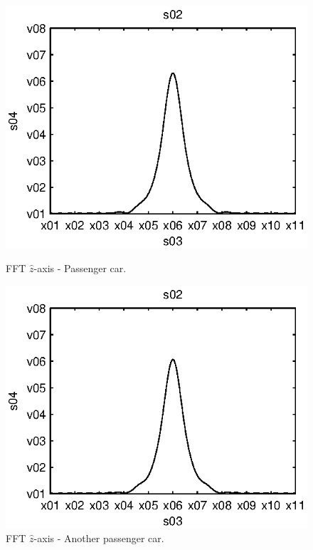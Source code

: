 
\begin{subfigures}
\begin{figure}[thb]
 \centering
 \begin{minipage}{0.45\linewidth}
 	\centering
 	
	\includegraphics[width=1\linewidth]{images/fft-car-z}
  	\caption[FFT $\hat{z}$-axis - Passenger car]{FFT $\hat{z}$-axis - Passenger car.\\}
  	\label{fig:fft-car-z}
 \end{minipage} \hfill
 \begin{minipage}{0.45\linewidth}
 	\centering
  	
	\includegraphics[width=1\linewidth]{images/fft-car3-z}
  	\caption[FFT $\hat{z}$-axis - Another passenger car]{FFT $\hat{z}$-axis - Another passenger car.}
  	\label{fig:fft-car3-z}
 \end{minipage}


\end{figure}
\end{subfigures}
